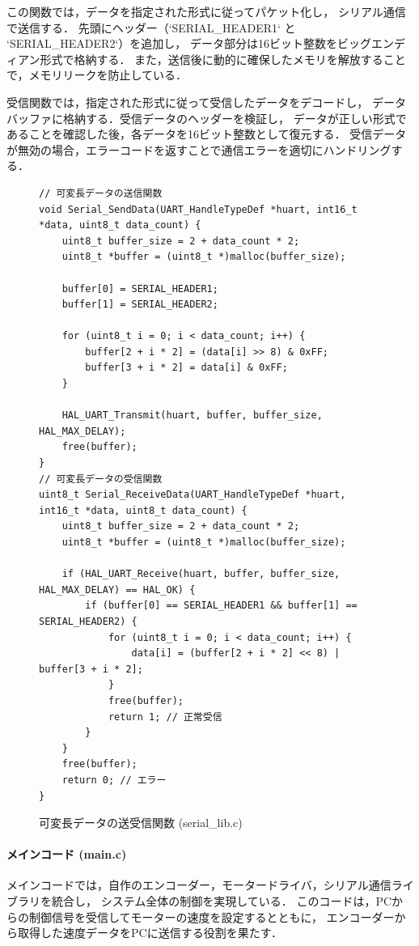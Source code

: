 この関数では，データを指定された形式に従ってパケット化し，
シリアル通信で送信する．
先頭にヘッダー（`SERIAL\_HEADER1` と `SERIAL\_HEADER2`）を追加し，
データ部分は16ビット整数をビッグエンディアン形式で格納する．
また，送信後に動的に確保したメモリを解放することで，メモリリークを防止している．

受信関数では，指定された形式に従って受信したデータをデコードし，
データバッファに格納する．受信データのヘッダーを検証し，
データが正しい形式であることを確認した後，各データを16ビット整数として復元する．
受信データが無効の場合，エラーコードを返すことで通信エラーを適切にハンドリングする．


\lstset{language=C}
\begin{figure}[H]
    \centering
    \begin{lstlisting}
// 可変長データの送信関数
void Serial_SendData(UART_HandleTypeDef *huart, int16_t *data, uint8_t data_count) {
    uint8_t buffer_size = 2 + data_count * 2;
    uint8_t *buffer = (uint8_t *)malloc(buffer_size);

    buffer[0] = SERIAL_HEADER1;
    buffer[1] = SERIAL_HEADER2;

    for (uint8_t i = 0; i < data_count; i++) {
        buffer[2 + i * 2] = (data[i] >> 8) & 0xFF;
        buffer[3 + i * 2] = data[i] & 0xFF;
    }

    HAL_UART_Transmit(huart, buffer, buffer_size, HAL_MAX_DELAY);
    free(buffer);
}
// 可変長データの受信関数
uint8_t Serial_ReceiveData(UART_HandleTypeDef *huart, int16_t *data, uint8_t data_count) {
    uint8_t buffer_size = 2 + data_count * 2;
    uint8_t *buffer = (uint8_t *)malloc(buffer_size);

    if (HAL_UART_Receive(huart, buffer, buffer_size, HAL_MAX_DELAY) == HAL_OK) {
        if (buffer[0] == SERIAL_HEADER1 && buffer[1] == SERIAL_HEADER2) {
            for (uint8_t i = 0; i < data_count; i++) {
                data[i] = (buffer[2 + i * 2] << 8) | buffer[3 + i * 2];
            }
            free(buffer);
            return 1; // 正常受信
        }
    }
    free(buffer);
    return 0; // エラー
}
    \end{lstlisting}
    \caption{可変長データの送受信関数 (serial\_lib.c)}
    \label{lst:serial}
\end{figure}


\paragraph{メインコード (main.c)}
メインコードでは，自作のエンコーダー，モータードライバ，シリアル通信ライブラリを統合し，
システム全体の制御を実現している．
このコードは，PCからの制御信号を受信してモーターの速度を設定するとともに，
エンコーダーから取得した速度データをPCに送信する役割を果たす．

